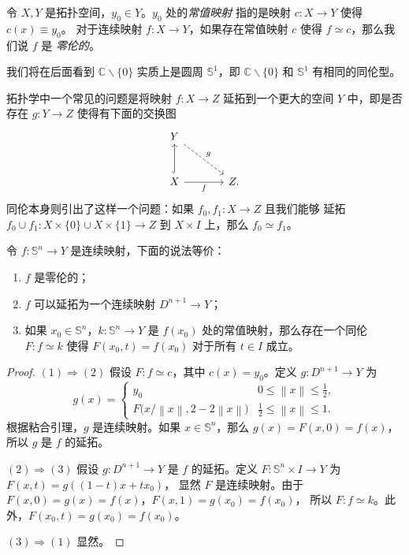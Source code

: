 \documentclass[fontset=none]{Notes}
\newcommand{\norm}[1]{\left\lVert#1\right\rVert}
\begin{document}
\begin{definition}
  令 $X,Y$ 是拓扑空间，$y_0\in Y$。$y_0$ 处的\emph{常值映射}
  指的是映射 $c:X\to Y$ 使得 $c(x)\equiv y_0$。
  对于连续映射 $f:X\to Y$，如果存在常值映射 $c$ 使得 $f\simeq c$，那么我们说 $f$ 是
  \emph{零伦的}。
\end{definition}

\begin{remark}
  我们将在后面看到 $\mathbb{C}\smallsetminus\{0\}$ 实质上是圆周
  $\mathbb{S}^1$，即 $\mathbb{C}\smallsetminus\{0\}$ 和 $\mathbb{S}^1$
  有相同的同伦型。
\end{remark}

拓扑学中一个常见的问题是将映射 $f:X\to Z$ 延拓到一个更大的空间 $Y$
中，即是否存在 $g:Y\to Z$ 使得有下面的交换图
\[
  \begin{tikzcd}[column sep=large,row sep=large]
    Y\arrow[dr,"g",dashrightarrow] & \\
    X\arrow[u,hook]\arrow[r,"f"'] & Z  .
  \end{tikzcd}
\]
同伦本身则引出了这样一个问题：如果 $f_0,f_1:X\to Z$ 且我们能够
延拓 $f_0\cup f_1:X\times\{0\}\cup X\times\{1\}\to Z$ 到
$X\times I$ 上，那么 $f_0\simeq f_1$。

\begin{theorem}
  令 $f:\mathbb{S}^n\to Y$ 是连续映射，下面的说法等价：
  \begin{enumerate}
    \item $f$ 是零伦的；
    \item $f$ 可以延拓为一个连续映射 $D^{n+1}\to Y$；
    \item 如果 $x_0\in \mathbb{S}^n$，$k:\mathbb{S}^n\to Y$
    是 $f(x_0)$ 处的常值映射，那么存在一个同伦 $F:f\simeq k$
    使得 $F(x_0,t)=f(x_0)$ 对于所有 $t\in I$ 成立。
  \end{enumerate}
\end{theorem}
\begin{proof}
  $(1)\Rightarrow(2)$ 假设 $F:f\simeq c$，其中 $c(x)=y_0$。定义
  $g:D^{n+1}\to Y$ 为
  \[
    g(x)=\begin{cases}
      y_0 & 0\leq \norm{x}\leq\frac{1}{2},\\
      F\bigl(x/\norm{x},2-2\norm{x}\bigr) & 
      \frac{1}{2}\leq\norm{x}\leq 1.
    \end{cases}
  \]
  根据粘合引理，$g$ 是连续映射。如果 $x\in \mathbb{S}^n$，那么
  $g(x)=F(x,0)=f(x)$，所以 $g$ 是 $f$ 的延拓。

  $(2)\Rightarrow(3)$ 假设 $g:D^{n+1}\to Y$ 是 $f$ 的延拓。定义
  $F:\mathbb{S}^{n}\times I\to Y$ 为 $F(x,t)=g((1-t)x+tx_0)$，
  显然 $F$ 是连续映射。由于 $F(x,0)=g(x)=f(x)$，$F(x,1)=g(x_0)=f(x_0)$，
  所以 $F:f\simeq k$。此外，$F(x_0,t)=g(x_0)=f(x_0)$。

  $(3)\Rightarrow (1)$ 显然。
\end{proof}
\end{document}
